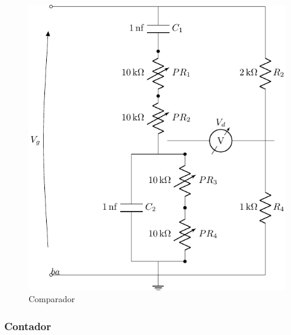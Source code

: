 \begin{figure}[H]
\centering
\includegraphics[scale=0.8]{Ejercicio8/Circuitos/Comparador.pdf}
\caption{Comparador}
\label{fig:Comparador}
\end{figure}

\subsubsection{Contador}

